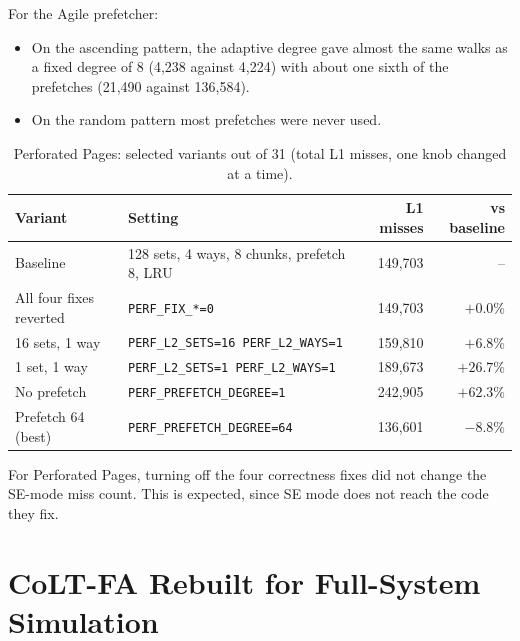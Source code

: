 \noindent For the Agile prefetcher:
\begin{itemize}
    \item On the ascending pattern, the adaptive degree gave almost the same walks as a fixed degree of 8 (4,238 against 4,224) with about one sixth of the prefetches (21,490 against 136,584).
    \item On the random pattern most prefetches were never used.
\end{itemize}

\begin{table}[H]
\centering
\small
\caption{Perforated Pages: selected variants out of 31 (total L1 misses, one knob changed at a time).}
\label{tab:sweep_perf}
\begin{tabular}{l l r r}
\toprule
\textbf{Variant} & \textbf{Setting} & \textbf{L1 misses} & \textbf{vs baseline} \\
\midrule
Baseline & 128 sets, 4 ways, 8 chunks, prefetch 8, LRU & 149,703 & -- \\
All four fixes reverted & \texttt{PERF\_FIX\_*=0} & 149,703 & $+0.0\%$ \\
16 sets, 1 way & \texttt{PERF\_L2\_SETS=16 PERF\_L2\_WAYS=1} & 159,810 & $+6.8\%$ \\
1 set, 1 way & \texttt{PERF\_L2\_SETS=1 PERF\_L2\_WAYS=1} & 189,673 & $+26.7\%$ \\
No prefetch & \texttt{PERF\_PREFETCH\_DEGREE=1} & 242,905 & $+62.3\%$ \\
Prefetch 64 (best) & \texttt{PERF\_PREFETCH\_DEGREE=64} & 136,601 & $-8.8\%$ \\
\bottomrule
\end{tabular}
\end{table}

\noindent For Perforated Pages, turning off the four correctness fixes did not change the SE-mode miss count. This is expected, since SE mode does not reach the code they fix.

\section{CoLT-FA Rebuilt for Full-System Simulation}
\label{sec:colt_fs}

